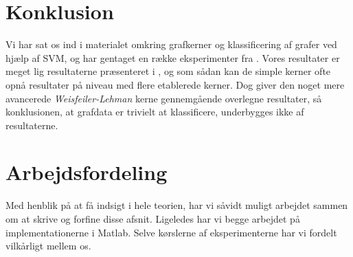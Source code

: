 \documentclass{article}
\begin{document}
\section{Konklusion}
Vi har sat os ind i materialet omkring grafkerner og klassificering af grafer ved hjælp af SVM, og har gentaget en række eksperimenter fra \cite{trivial-kernels}.
Vores resultater er meget lig resultaterne præsenteret i \cite{trivial-kernels}, og som sådan kan de simple kerner ofte opnå resultater på niveau med flere etablerede kerner. Dog giver den noget mere avancerede \textit{Weisfeiler-Lehman} kerne gennemgående overlegne resultater, så konklusionen, at grafdata er trivielt at klassificere, underbygges ikke af resultaterne.

\section{Arbejdsfordeling}
Med henblik på at få indsigt i hele teorien, har vi såvidt muligt arbejdet sammen om at skrive og forfine disse afsnit. Ligeledes har vi begge arbejdet på implementationerne i Matlab. Selve kørslerne af eksperimenterne har vi fordelt vilkårligt mellem os.
\end{document}

